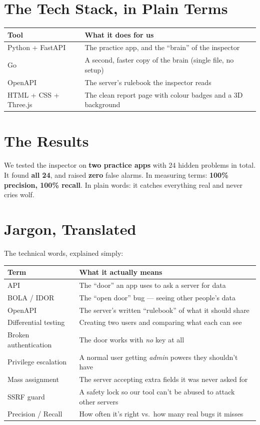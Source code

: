 \documentclass[11pt]{article}
\begin{document}
\section{The Tech Stack, in Plain Terms}

\begin{center}
\begin{tabular}{ll}
\toprule
\textbf{Tool} & \textbf{What it does for us} \\
\midrule
Python + FastAPI & The practice app, and the ``brain'' of the inspector \\
Go & A second, faster copy of the brain (single file, no setup) \\
OpenAPI & The server's rulebook the inspector reads \\
HTML + CSS + Three.js & The clean report page with colour badges and a 3D background \\
\bottomrule
\end{tabular}
\end{center}

\section{The Results}

We tested the inspector on \textbf{two practice apps} with 24 hidden problems in
total. It found \textbf{all 24}, and raised \textbf{zero} false alarms. In
measuring terms: \textbf{100\% precision, 100\% recall}. In plain words: it
catches everything real and never cries wolf.

\section{Jargon, Translated}

\noindent The technical words, explained simply:

\begin{center}
\small
\begin{tabular}{ll}
\toprule
\textbf{Term} & \textbf{What it actually means} \\
\midrule
API & The ``door'' an app uses to ask a server for data \\
BOLA / IDOR & The ``open door'' bug --- seeing other people's data \\
OpenAPI & The server's written ``rulebook'' of what it should share \\
Differential testing & Creating two users and comparing what each can see \\
Broken authentication & The door works with \emph{no} key at all \\
Privilege escalation & A normal user getting \emph{admin} powers they shouldn't have \\
Mass assignment & The server accepting extra fields it was never asked for \\
SSRF guard & A safety lock so our tool can't be abused to attack other servers \\
Precision / Recall & How often it's right vs.\ how many real bugs it misses \\
\bottomrule
\end{tabular}
\end{center}
\end{document}
